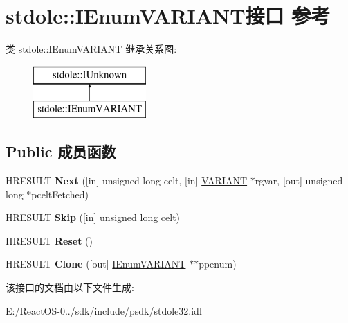 \hypertarget{interfacestdole_1_1_i_enum_v_a_r_i_a_n_t}{}\section{stdole\+:\+:I\+Enum\+V\+A\+R\+I\+A\+N\+T接口 参考}
\label{interfacestdole_1_1_i_enum_v_a_r_i_a_n_t}
类 stdole\+:\+:I\+Enum\+V\+A\+R\+I\+A\+NT 继承关系图\+:\begin{figure}[H]
\begin{center}
\leavevmode
\includegraphics[height=2.000000cm]{interfacestdole_1_1_i_enum_v_a_r_i_a_n_t}
\end{center}
\end{figure}
\subsection*{Public 成员函数}
\begin{DoxyCompactItemize}
\item 
\mbox{\label{interfacestdole_1_1_i_enum_v_a_r_i_a_n_t_a3e442fc8f846ee248781e2726d510847}} 
H\+R\+E\+S\+U\+LT {\bfseries Next} (\mbox{[}in\mbox{]} unsigned long celt, \mbox{[}in\mbox{]} \hyperlink{interfacevoid}{V\+A\+R\+I\+A\+NT} $\ast$rgvar, \mbox{[}out\mbox{]} unsigned long $\ast$pcelt\+Fetched)
\item 
\mbox{\label{interfacestdole_1_1_i_enum_v_a_r_i_a_n_t_ade7ba98fd9e15bfa266cbf634a662dcc}} 
H\+R\+E\+S\+U\+LT {\bfseries Skip} (\mbox{[}in\mbox{]} unsigned long celt)
\item 
\mbox{\label{interfacestdole_1_1_i_enum_v_a_r_i_a_n_t_a90cf7c5980a9476de87d3c5a882d19f1}} 
H\+R\+E\+S\+U\+LT {\bfseries Reset} ()
\item 
\mbox{\label{interfacestdole_1_1_i_enum_v_a_r_i_a_n_t_ad1ecf9fd1da7ff21155405090c6a3fc7}} 
H\+R\+E\+S\+U\+LT {\bfseries Clone} (\mbox{[}out\mbox{]} \hyperlink{interfacestdole_1_1_i_enum_v_a_r_i_a_n_t}{I\+Enum\+V\+A\+R\+I\+A\+NT} $\ast$$\ast$ppenum)
\end{DoxyCompactItemize}


该接口的文档由以下文件生成\+:\begin{DoxyCompactItemize}
\item 
E\+:/\+React\+O\+S-\/0../sdk/include/psdk/stdole32.\+idl\end{DoxyCompactItemize}
